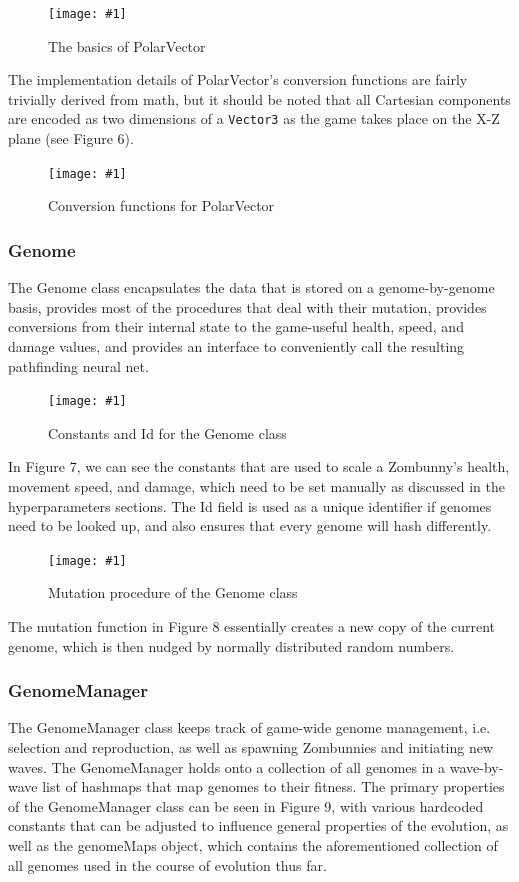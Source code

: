 \documentclass[letterpaper]{article}
\def\imfig#1#2{\begin{figure}[h] \centering \texttt{[image: \#1]} \caption{#2} \end{figure}}
\def\imfigB#1#2{\begin{figure} \centering \texttt{[image: \#1]} \caption{#2} \end{figure}}
\begin{document}
\imfigB{PolarVector1}{The basics of PolarVector}

The implementation details of PolarVector's conversion functions are fairly
trivially derived from math, but it should be noted that all Cartesian
components are encoded as two dimensions of a \texttt{Vector3} as the game takes
place on the X-Z plane (see Figure 6).

\imfigB{PolarVector2}{Conversion functions for PolarVector}

\subsubsection{Genome}
The Genome class encapsulates the data that is stored on a genome-by-genome
basis, provides most of the procedures that deal with their mutation, provides
conversions from their internal state to the game-useful health, speed, and
damage values, and provides an interface to conveniently call the resulting
pathfinding neural net.

\imfigB{Genome1}{Constants and Id for the Genome class}

In Figure 7, we can see the constants that are used to scale a Zombunny's
health, movement speed, and damage, which need to be set manually as discussed
in the hyperparameters sections. The Id field is used as a unique identifier if
genomes need to be looked up, and also ensures that every genome will hash differently.

\imfig{Mutation}{Mutation procedure of the Genome class}

The mutation function in Figure 8 essentially creates a new copy of the current genome, which is then nudged by normally distributed random numbers.

\subsubsection{GenomeManager}

The GenomeManager class keeps track of game-wide genome management, i.e. selection and reproduction, as well as spawning Zombunnies and initiating new waves. The GenomeManager holds onto a collection of all genomes in a wave-by-wave list of hashmaps that map genomes to their fitness. The primary properties of the GenomeManager class can be seen in Figure 9, with various hardcoded constants that can be adjusted to influence general properties of the evolution, as well as the genomeMaps object, which contains the aforementioned collection of all genomes used in the course of evolution thus far.
\end{document}
